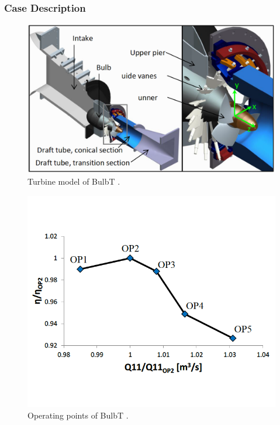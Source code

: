 \subsubsection{Case Description}
\begin{figure}[t]  
\centering
     \includegraphics[clip=true, trim= 0.0cm 0.0cm 0.0cm 0.0cm,width=0.99\linewidth]{./figures/bulbt/bulbt}                            
     \caption{Turbine model of BulbT \cite{vuillemard2014experimental}.}
     \label{bulbt}
\end{figure} 
\begin{figure}[t] 
\centering
     \includegraphics[clip=true, trim= 0.0cm 3.0cm 0.0cm 3.0cm,width=0.99\linewidth]{./figures/bulbt/bulbt-op}                  
     \caption{Operating points of BulbT \cite{vuillemard2014experimental}.}
     \label{bulbt-op}
\end{figure}

